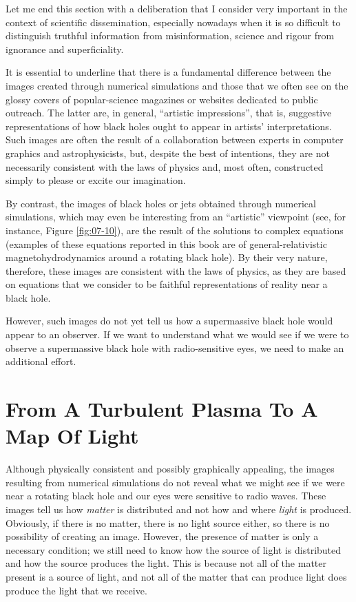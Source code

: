 Let me end this section with a deliberation that I consider very important in the
context of scientific dissemination, especially nowadays when it is so difficult to
distinguish truthful information from misinformation, science and rigour from ignorance
and superficiality.

It is essential to underline that there is a fundamental difference between the images
created through numerical simulations and those that we often see on the glossy covers
of popular-science magazines or websites dedicated to public outreach. The latter are,
in general, ``artistic impressions'', that is, suggestive
representations of how black holes ought to appear in artists' interpretations. Such
images are often the result of a collaboration between experts in computer graphics and
astrophysicists, but, despite the best of intentions, they are not necessarily
consistent with the laws of physics and, most often, constructed simply to please or
excite our imagination.

By contrast, the images of black holes or jets obtained through numerical simulations,
which may even be interesting from an ``artistic'' viewpoint (see, for instance, Figure
\ref{fig:07-10}), are the result of the solutions to complex equations (examples of these equations
reported in this book are of general-relativistic magnetohydrodynamics around a rotating
black hole). By their very nature, therefore, these images are consistent with the laws
of physics, as they are based on equations that we consider to be faithful
representations of reality near a black hole.

However, such images do not yet tell us how a supermassive black hole would appear to an
observer. If we want to understand what we would see if we were to observe a
supermassive black hole with radio-sensitive eyes, we need to make an additional effort.

\section{From A Turbulent Plasma To A Map Of Light}\label{sec:07-map}

Although physically consistent and possibly graphically appealing, the images resulting
from numerical simulations do not reveal what we might see if we were near a rotating
black hole and our eyes were sensitive to radio waves. These images
tell us how \emph{matter} is distributed and not how and where \emph{light} is produced.
Obviously, if there is no matter, there is no light source either, so there is no
possibility of creating an image. However, the presence of matter is only a necessary
condition; we still need to know how the source of light is distributed and how the
source produces the light. This is because not all of the matter present is a source of
light, and not all of the matter that can produce light does produce the light that we
receive.

